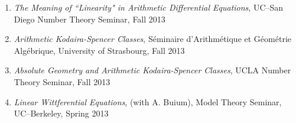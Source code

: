 \documentclass[a4paper,10pt]{article}
\begin{document}
\begin{enumerate}
	\item \emph{The Meaning of ``Linearity" in Arithmetic Differential Equations}, UC--San Diego Number Theory Seminar, Fall 2013
	\item \emph{Arithmetic Kodaira-Spencer Classes}, S\'eminaire d'Arithm\'etique et G\'eom\'etrie Alg\'ebrique, University of Strasbourg, Fall 2013
	\item \emph{Absolute Geometry and Arithmetic Kodaira-Spencer Classes}, UCLA Number Theory Seminar, Fall 2013
	\item \emph{Linear Wittferential Equations}, (with A. Buium), Model Theory Seminar, UC--Berkeley, Spring 2013
\end{enumerate}
\end{document}
